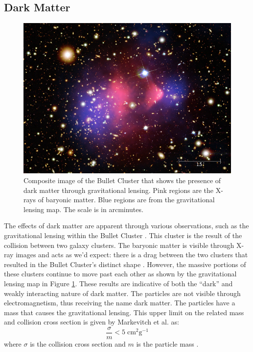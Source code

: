 \documentclass[thesis.tex]{subfiles}
\begin{document}
\subsection{Dark Matter} \label{subsec:DM}
\begin{figure}[t]
	\centering
	\includegraphics[width=0.8\linewidth]{figures/bullet-cluster.jpg}
	\caption{
	Composite image of the Bullet Cluster that shows the presence of dark matter through gravitational lensing.
	Pink regions are the X-rays of baryonic matter.
	Blue regions are from the gravitational lensing map.
	The scale is in arcminutes. \cite{Bullet-Image}
	}
	\label{fig:bullet-cluster}
\end{figure}
The effects of dark matter are apparent through various observations, such as the gravitational lensing within the Bullet Cluster \cite{Bullet}.
This cluster is the result of the collision between two galaxy clusters.
The baryonic matter is visible through X-ray images and acts as we'd expect: there is a drag between the two clusters that resulted in the Bullet Cluster's distinct shape \cite{Bullet}.
However, the massive portions of these clusters continue to move past each other as shown by the gravitational lensing map in Figure \ref{fig:bullet-cluster}.
These results are indicative of both the ``dark'' and weakly interacting nature of dark matter.
The particles are not visible through electromagnetism, thus receiving the name dark matter.
The particles have a mass that causes the gravitational lensing.
This upper limit on the related mass and collision cross section is given by Markevitch et al. \cite{DM_Hist} as:
\begin{equation} \label{eq:DM-Mass-Lim}
	\frac{\sigma}{m} < 5 \; \text{cm}^2 \text{g}^{-1}
\end{equation}
where $\sigma$ is the collision cross section and $m$ is the particle mass \cite{Bullet}.
\end{document}

